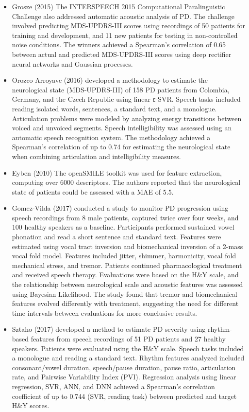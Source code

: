 \begin{itemize}
    \item Grosze (2015) The INTERSPEECH 2015 Computational Paralinguistic Challenge also addressed automatic acoustic analysis of PD. The challenge involved predicting MDS-UPDRS-III scores using recordings of 50 patients for training and development, and 11 new patients for testing in non-controlled noise conditions. The winners achieved a Spearman’s correlation of 0.65 between actual and predicted MDS-UPDRS-III scores using deep rectifier neural networks and Gaussian processes.
    \item Orozco-Arroyave (2016) developed a methodology to estimate the neurological state (MDS-UPDRS-III) of 158 PD patients from Colombia, Germany, and the Czech Republic using linear ε-SVR. Speech tasks included reading isolated words, sentences, a standard text, and a monologue. Articulation problems were modeled by analyzing energy transitions between voiced and unvoiced segments. Speech intelligibility was assessed using an automatic speech recognition system. The methodology achieved a Spearman’s correlation of up to 0.74 for estimating the neurological state when combining articulation and intelligibility measures.
    \item Eyben (2010) The openSMILE toolkit was used for feature extraction, computing over 6000 descriptors. The authors reported that the neurological state of patients could be assessed with a MAE of 5.5.
    \item Gomez-Vilda (2017) conducted a study to monitor PD progression using speech recordings from 8 male patients, captured twice over four weeks, and 100 healthy speakers as a baseline. Participants performed sustained vowel phonation and read a short sentence and standard text. Features were estimated using vocal tract inversion and biomechanical inversion of a 2-mass vocal fold model. Features included jitter, shimmer, harmonicity, vocal fold mechanical stress, and tremor. Patients continued pharmacological treatment and received speech therapy. Evaluations were based on the H\&Y scale, and the relationship between neurological scale and acoustic features was assessed using Bayesian Likelihood. The study found that tremor and biomechanical features evolved differently with treatment, suggesting the need for different time intervals between evaluations for more conclusive results.
    \item Sztaho (2017) developed a method to estimate PD severity using rhythm-based features from speech recordings of 51 PD patients and 27 healthy speakers. Patients were evaluated using the H\&Y scale. Speech tasks included a monologue and reading a standard text. Rhythm features analyzed included consonant/vowel duration, speech/pause duration, pause ratio, articulation rate, and Pairwise Variability Index (PVI). Regression analysis using linear regression, SVR, ANN, and DNN achieved a Spearman’s correlation coefficient of up to 0.744 (SVR, reading task) between predicted and target H\&Y scores.

\end{itemize}

